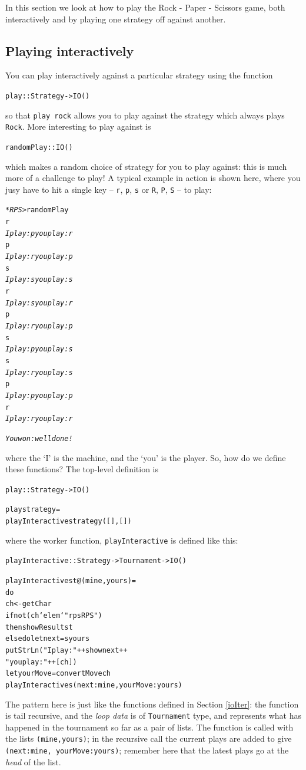 In this section we look at how to play the Rock - Paper - Scissors game, both interactively and by playing one strategy off against another.

\subsection*{Playing interactively}

You can play interactively against a particular strategy using the function
\begin{alltt}
play :: Strategy -> IO ()
\end{alltt}
so that \texttt{play rock} allows you to play against the strategy which always plays \texttt{Rock}. More interesting to play against is 
\begin{alltt}
randomPlay :: IO ()
\end{alltt}
which makes a random choice of strategy for you to play against: this is much more of a challenge to play! A typical example in action is shown here, where you jusy have to hit a single key -- \texttt{r}, \texttt{p}, \texttt{s} or \texttt{R}, \texttt{P}, \texttt{S} -- to play:
\begin{alltt}
\textsl{*RPS>} randomPlay
r
\textsl{I play: p you play: r}
p
\textsl{I play: r you play: p}
s
\textsl{I play: s you play: s}
r
\textsl{I play: s you play: r}
p
\textsl{I play: r you play: p}
s
\textsl{I play: p you play: s}
s
\textsl{I play: r you play: s}
p
\textsl{I play: p you play: p}
r
\textsl{I play: r you play: r}

\textsl{You won: well done!}
\end{alltt}
where the `I' is the machine, and the `you' is the player. 
So, how do we define these functions? The top-level definition is 
\begin{alltt}
play :: Strategy -> IO ()

play strategy =
    playInteractive strategy ([],[])
\end{alltt}
where the worker function, \texttt{playInteractive} is defined like this:
\begin{alltt}
playInteractive :: Strategy -> Tournament -> IO ()

playInteractive s t@(mine,yours) =
    do 
      ch <- getChar
      if not (ch `elem` "rpsRPS") 
        then showResults t 
        else do let next = s yours 
                putStrLn ("I play: " ++ show next ++ 
                          " you play: " ++ [ch])
                let yourMove = convertMove ch
                playInteractive s (next:mine, yourMove:yours)
\end{alltt}
The pattern here is just like the functions defined in Section \ref{ioIter}: the function is tail recursive, and the \emph{loop data} is of \texttt{Tournament} type, and  represents what has happened in the tournament so far as a pair of lists. The function is called with the lists \texttt{(mine,yours)}; in the recursive call the current plays are added to give \texttt{(next:mine, yourMove:yours)}; remember  here that the latest plays go at the \emph{head} of the list.

